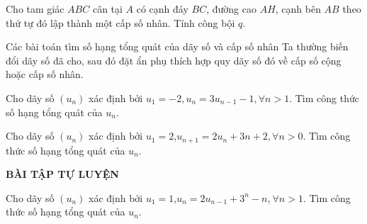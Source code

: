 \begin{bt}%
	Cho tam giác $ABC$ cân tại $A$ có cạnh đáy $BC$, đường cao $AH$, cạnh bên $AB$ theo thứ tự đó lập thành một cấp số nhân. Tính công bội $q$.
\end{bt}
\newpage
\begin{dang}{Các bài toán tìm số hạng tổng quát của dãy số và cấp số nhân}
Ta thường biến đổi dãy số đã cho, sau đó đặt ẩn phụ thích hợp quy dãy số đó về cấp số cộng hoặc cấp số nhân.
\end{dang}
\begin{vd}%
	Cho dãy số $(u_n)$ xác định bởi $u_1=-2,u_n=3u_{n-1}-1,\forall n>1.$ Tìm công thức số hạng tổng quát của $u_n$.
\end{vd}
\begin{vd}%
	Cho dãy số $(u_n)$ xác định bởi $u_1=2$,$u_{n+1}=2u_n+3n+2,$$\forall n>0.$ Tìm công thức số hạng tổng quát của $u_n$.
\end{vd}
\begin{center}
	\textbf{BÀI TẬP TỰ LUYỆN}
\end{center}
\begin{bt}%
	Cho dãy số $(u_n)$ xác định bởi $u_1=1$,$u_n=2u_{n-1}+3^n-n$,$\ \forall n>1.$ Tìm công thức số hạng tổng quát của $u_n$.
\end{bt}
